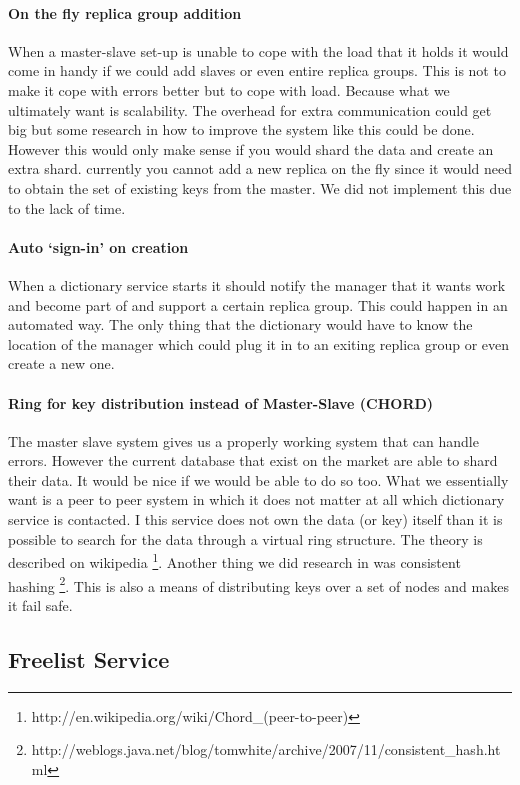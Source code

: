 \documentclass[12pt,a4paper]{scrartcl}
\begin{document}
\paragraph{On the fly replica group addition}
When a master-slave set-up is unable to cope with the load that it holds it would come in handy if we could add slaves or even entire replica groups. This is not to make it cope with errors better but to cope with load. Because what we ultimately want is scalability. The overhead for extra communication could get big but some research in how to improve the system like this could be done. However this would only make sense if you would shard the data and create an extra shard. currently you cannot add a new replica on the fly since it would need to obtain the set of existing keys from the master. We did not implement this due to the lack of time.

\paragraph{Auto `sign-in' on creation}
When a dictionary service starts it should notify the manager that it wants work and become part of and support a certain replica group. This could happen in an automated way. The only thing that the dictionary would have to know the location of the manager which could plug it in to an exiting replica group or even create a new one.

\paragraph{Ring for key distribution instead of Master-Slave (CHORD)}
The master slave system gives us a properly working system that can handle errors. However the current database that exist on the market are able to shard their data. It would be nice if we would be able to do so too. What we essentially want is a peer to peer system in which it does not matter at all which dictionary service is contacted. I this service does not own the data (or key) itself than it is possible to search for the data through a virtual ring structure. The theory is described on wikipedia \footnote{http://en.wikipedia.org/wiki/Chord\_(peer-to-peer)}. Another thing we did research in was consistent hashing \footnote{http://weblogs.java.net/blog/tomwhite/archive/2007/11/consistent\_hash.html}. This is also a means of distributing keys over a set of nodes and makes it fail safe.

\subsection{Freelist Service}
\end{document}
